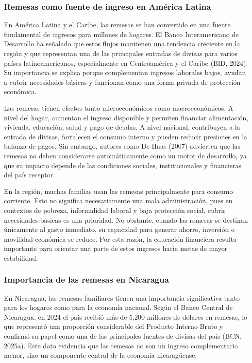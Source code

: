 \documentclass[12pt,letterpaper]{article}
\begin{document}
\subsubsection{\texorpdfstring{\textbf{Remesas como fuente de ingreso en América Latina}}{Remesas como fuente de ingreso en América Latina}}\label{remesas-como-fuente-de-ingreso-en-amuxe9rica-latina}

En América Latina y el Caribe, las remesas se han convertido en una fuente fundamental de ingresos para millones de hogares. El Banco Interamericano de Desarrollo ha señalado que estos flujos mantienen una tendencia creciente en la región y que representan una de las principales entradas de divisas para varios países latinoamericanos, especialmente en Centroamérica y el Caribe (BID, 2024). Su importancia se explica porque complementan ingresos laborales bajos, ayudan a cubrir necesidades básicas y funcionan como una forma privada de protección económica.

Las remesas tienen efectos tanto microeconómicos como macroeconómicos. A nivel del hogar, aumentan el ingreso disponible y permiten financiar alimentación, vivienda, educación, salud y pago de deudas. A nivel nacional, contribuyen a la entrada de divisas, fortalecen el consumo interno y pueden reducir presiones en la balanza de pagos. Sin embargo, autores como De Haas (2007) advierten que las remesas no deben considerarse automáticamente como un motor de desarrollo, ya que su impacto depende de las condiciones sociales, institucionales y financieras del país receptor.

En la región, muchas familias usan las remesas principalmente para consumo corriente. Esto no significa necesariamente una mala administración, pues en contextos de pobreza, informalidad laboral y baja protección social, cubrir necesidades básicas es una prioridad. No obstante, cuando las remesas se destinan únicamente al gasto inmediato, su capacidad para generar ahorro, inversión o movilidad económica se reduce. Por esta razón, la educación financiera resulta importante para orientar una parte de estos ingresos hacia metas de mayor estabilidad.

\subsubsection{\texorpdfstring{\textbf{Importancia de las remesas en Nicaragua}}{Importancia de las remesas en Nicaragua}}\label{importancia-de-las-remesas-en-nicaragua}

En Nicaragua, las remesas familiares tienen una importancia significativa tanto para los hogares como para la economía nacional. Según el Banco Central de Nicaragua, en 2024 el país recibió más de 5,200 millones de dólares en remesas, lo que representó una proporción considerable del Producto Interno Bruto y confirmó su papel como una de las principales fuentes de divisas del país (BCN, 2025a). Este dato evidencia que las remesas no son un ingreso complementario menor, sino un componente central de la economía nicaragüense.
\end{document}
